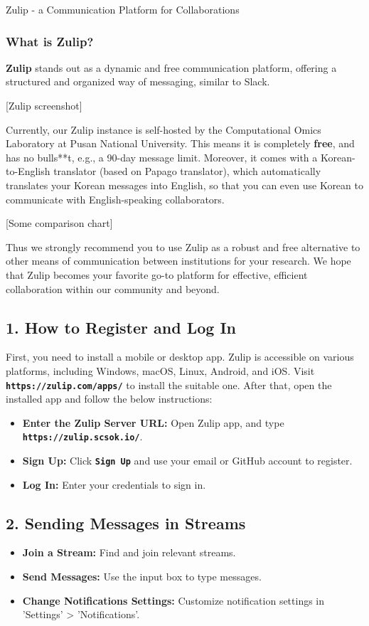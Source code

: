 \begin{coverpage}{Zulip - a Communication Platform for Collaborations}
{
\subsubsection*{What is Zulip?}
\textbf{Zulip} stands out as a dynamic and free communication platform, offering a structured and organized way of messaging, similar to Slack.

[Zulip screenshot]

Currently, our Zulip instance is self-hosted by the Computational Omics Laboratory at Pusan National University. This means it is completely \textbf{free}, and has no bulls**t, e.g., a 90-day message limit. Moreover, it comes with a Korean-to-English translator (based on Papago translator), which automatically translates your Korean messages into English, so that you can even use Korean to communicate with English-speaking collaborators.

[Some comparison chart]

Thus we strongly recommend you to use Zulip as a robust and free alternative to other means of communication between institutions for your research. We hope that Zulip becomes your favorite go-to platform for effective, efficient collaboration within our community and beyond.

\subsection*{1. How to Register and Log In}
First, you need to install a mobile or desktop app. Zulip is accessible on various platforms, including Windows, macOS, Linux, Android, and iOS. Visit \textbf{\texttt{https://zulip.com/apps/}} to install the suitable one. After that, open the installed app and follow the below instructions:
\begin{itemize}[leftmargin=0.5cm, rightmargin=0.5cm]
\item \textbf{Enter the Zulip Server URL:} Open Zulip app, and type \\ \textbf{\texttt{https://zulip.scsok.io/}}.
\item \textbf{Sign Up:} Click \textbf{\texttt{Sign Up}} and use your email or GitHub account to register.
\item \textbf{Log In:} Enter your credentials to sign in.
\end{itemize}
\subsection*{2. Sending Messages in Streams}
\begin{itemize}[leftmargin=0.5cm, rightmargin=0.5cm]
\item \textbf{Join a Stream:} Find and join relevant streams.
\item \textbf{Send Messages:} Use the input box to type messages.
\item \textbf{Change Notifications Settings:} Customize notification settings in 'Settings' > 'Notifications'.
\end{itemize}
}
\end{coverpage}

